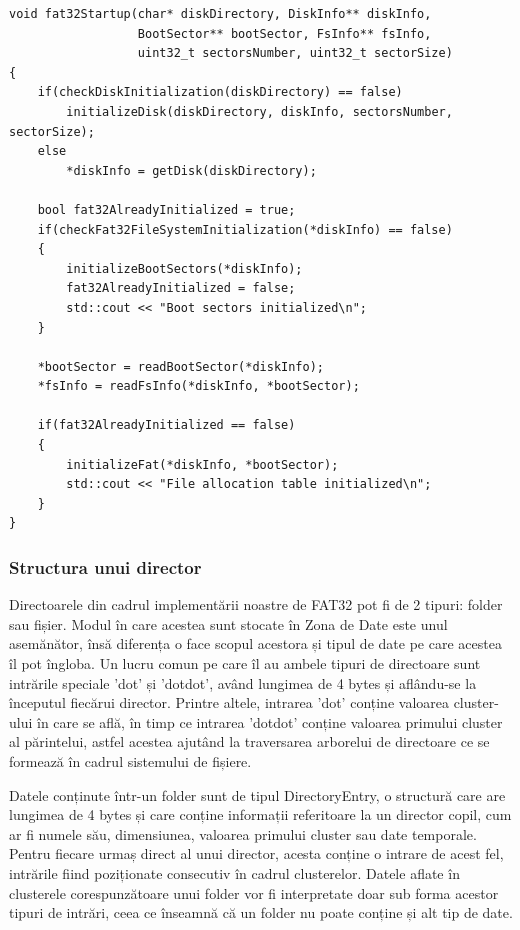 \bigskip

\lstset{style=code-snyppet-style}
\begin{lstlisting}
void fat32Startup(char* diskDirectory, DiskInfo** diskInfo, 
                  BootSector** bootSector, FsInfo** fsInfo, 
                  uint32_t sectorsNumber, uint32_t sectorSize)
{
    if(checkDiskInitialization(diskDirectory) == false)
        initializeDisk(diskDirectory, diskInfo, sectorsNumber, sectorSize);
    else
        *diskInfo = getDisk(diskDirectory);

    bool fat32AlreadyInitialized = true;
    if(checkFat32FileSystemInitialization(*diskInfo) == false)
    {
        initializeBootSectors(*diskInfo);
        fat32AlreadyInitialized = false;
        std::cout << "Boot sectors initialized\n";
    }

    *bootSector = readBootSector(*diskInfo);
    *fsInfo = readFsInfo(*diskInfo, *bootSector);

    if(fat32AlreadyInitialized == false)
    {
        initializeFat(*diskInfo, *bootSector);
        std::cout << "File allocation table initialized\n";
    }
}
\end{lstlisting}

\bigskip

\subsubsection{Structura unui director}

Directoarele din cadrul implementării noastre de FAT32 pot fi de 2 tipuri: folder sau fișier. Modul în care acestea sunt stocate în Zona de Date este unul asemănător, însă diferența o face scopul acestora și tipul de date pe care acestea îl pot îngloba. Un lucru comun pe care îl au ambele tipuri de directoare sunt intrările speciale 'dot' și 'dotdot', având lungimea de 4 bytes și aflându-se la începutul fiecărui director. Printre altele, intrarea 'dot' conține valoarea cluster-ului în care se află, în timp ce intrarea 'dotdot' conține valoarea primului cluster al părintelui, astfel acestea ajutând la traversarea arborelui de directoare ce se formează în cadrul sistemului de fișiere.

Datele conținute într-un folder sunt de tipul DirectoryEntry, o structură care are lungimea de 4 bytes și care conține informații referitoare la un director copil, cum ar fi numele său, dimensiunea, valoarea primului cluster sau date temporale. Pentru fiecare urmaș direct al unui director, acesta conține o intrare de acest fel, intrările fiind poziționate consecutiv în cadrul clusterelor. Datele aflate în clusterele corespunzătoare unui folder vor fi interpretate doar sub forma acestor tipuri de intrări, ceea ce înseamnă că un folder nu poate conține și alt tip de date.


